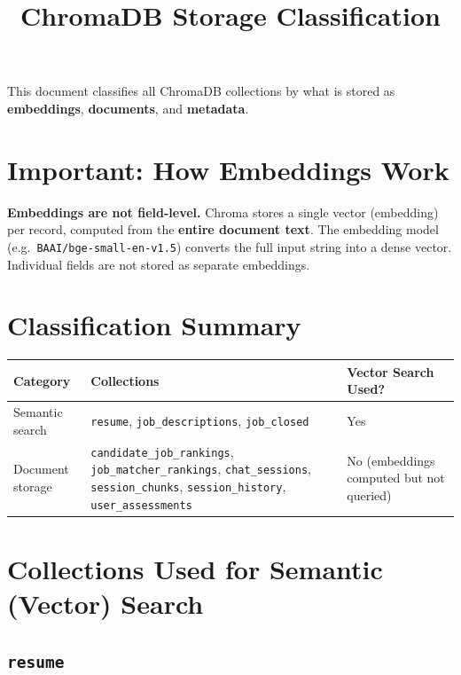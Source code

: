 \documentclass[11pt]{article}
\title{ChromaDB Storage Classification}
\author{}
\date{}
\begin{document}
\maketitle

This document classifies all ChromaDB collections by what is stored as \textbf{embeddings}, \textbf{documents}, and \textbf{metadata}.

\section*{Important: How Embeddings Work}

\textbf{Embeddings are not field-level.} Chroma stores a single vector (embedding) per record, computed from the \textbf{entire document text}. The embedding model (e.g.\ \texttt{BAAI/bge-small-en-v1.5}) converts the full input string into a dense vector. Individual fields are not stored as separate embeddings.

\section{Classification Summary}

\begin{table}[h]
\centering
\begin{tabular}{@{}lll@{}}
\toprule
\textbf{Category} & \textbf{Collections} & \textbf{Vector Search Used?} \\
\midrule
Semantic search & \texttt{resume}, \texttt{job\_descriptions}, \texttt{job\_closed} & Yes \\
Document storage & \texttt{candidate\_job\_rankings}, \texttt{job\_matcher\_rankings}, \texttt{chat\_sessions}, \texttt{session\_chunks}, \texttt{session\_history}, \texttt{user\_assessments} & No (embeddings computed but not queried) \\
\bottomrule
\end{tabular}
\end{table}

\section{Collections Used for Semantic (Vector) Search}

\subsection{\texttt{resume}}
\end{document}
